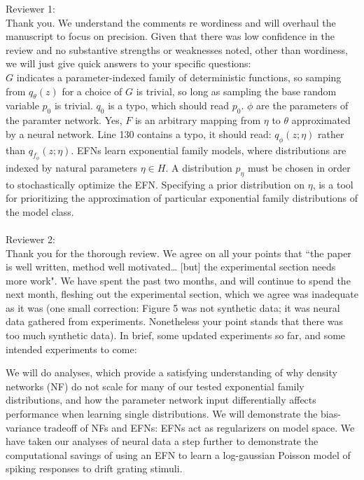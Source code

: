 \documentclass{article}
\begin{document}
Reviewer 1: \\

Thank you.  We understand the comments re wordiness and will overhaul the manuscript to focus on precision.  Given that there was low confidence in the review and no substantive strengths or weaknesses noted, other than wordiness, we will just give quick answers to your specific questions: \\

$G$ indicates a parameter-indexed family of deterministic functions, so samping from $q_\theta(z)$ for a choice of $G$ is trivial, so long as sampling the base random variable $p_0$ is trivial.  $q_0$ is a typo, which should read $p_0$.  $\phi$ are the parameters of the paramter network.  Yes, $F$ is an arbitrary mapping from $\eta$ to $\theta$ approximated by a neural network.  Line 130 contains a typo, it should read: $q_\phi(z; \eta)$ rather than $q_{f_\phi}(z; \eta)$.  EFNs learn exponential family models, where distributions are indexed by natural parameters $\eta \in H$.  A distribution $p_\eta$  must be chosen in order to stochastically optimize the EFN.  Specifying a prior distribution on $\eta$, is a tool for prioritizing the approximation of particular exponential family distributions of the model class. \\ \\



Reviewer 2: \\

Thank you for the thorough review.  We agree on all your points that ``the paper is well written, method well motivated… [but] the experimental section needs more work".  We have spent the past two months, and will continue to spend the next month, fleshing out the experimental section, which we agree was inadequate as it was (one small correction: Figure 5 was not synthetic data; it was neural data gathered from experiments.  Nonetheless your point stands that there was too much synthetic data).  In brief, some updated experiments so far, and some intended experiments to come:

We will do analyses, which provide a satisfying understanding of why density networks (NF) do not scale for many of our tested exponential family distributions, and how the parameter network input differentially affects performance when learning single distributions.  We will demonstrate the bias-variance tradeoff of NFs and EFNs: EFNs act as regularizers on model space.  We have taken our analyses of neural data a step further to demonstrate the computational savings of using an EFN to learn a log-gaussian Poisson model of spiking responses to drift grating stimuli. \\ \\
\end{document}
